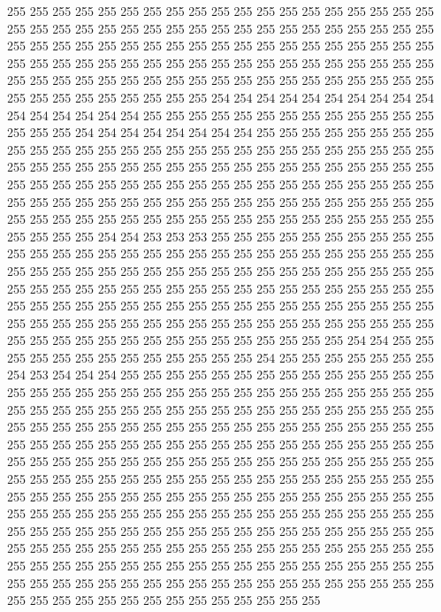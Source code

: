 255 255 255 255 255 255 255 255 255 255 255 255 255 255 255 255 255 255 255 255
255 255 255 255 255 255 255 255 255 255 255 255 255 255 255 255 255 255 255 255
255 255 255 255 255 255 255 255 255 255 255 255 255 255 255 255 255 255 255 255
255 255 255 255 255 255 255 255 255 255 255 255 255 255 255 255 255 255 255 255
255 255 255 255 255 255 255 255 255 255 255 255 255 255 255 255 255 255 255 255
255 255 255 255 254 254 254 254 254 254 254 254 254 254 254 254 254 254 254 254
255 255 255 255 255 255 255 255 255 255 255 255 255 255 255 255 254 254 254 254
254 254 254 254 255 255 255 255 255 255 255 255 255 255 255 255 255 255 255 255
255 255 255 255 255 255 255 255 255 255 255 255 255 255 255 255 255 255 255 255
255 255 255 255 255 255 255 255 255 255 255 255 255 255 255 255 255 255 255 255
255 255 255 255 255 255 255 255 255 255 255 255 255 255 255 255 255 255 255 255
255 255 255 255 255 255 255 255 255 255 255 255 255 255 255 255 255 255 255 255
255 255 255 255 255 255 255 255 255 255 255 254 254 253 253 253 255 255 255 255
255 255 255 255 255 255 255 255 255 255 255 255 255 255 255 255 255 255 255 255
255 255 255 255 255 255 255 255 255 255 255 255 255 255 255 255 255 255 255 255
255 255 255 255 255 255 255 255 255 255 255 255 255 255 255 255 255 255 255 255
255 255 255 255 255 255 255 255 255 255 255 255 255 255 255 255 255 255 255 255
255 255 255 255 255 255 255 255 255 255 255 255 255 255 255 255 255 255 255 255
255 255 255 255 255 255 255 255 255 255 255 255 255 255 255 255 254 254 255 255
255 255 255 255 255 255 255 255 255 255 255 254 255 255 255 255 255 255 255 254
253 254 254 254 255 255 255 255 255 255 255 255 255 255 255 255 255 255 255 255
255 255 255 255 255 255 255 255 255 255 255 255 255 255 255 255 255 255 255 255
255 255 255 255 255 255 255 255 255 255 255 255 255 255 255 255 255 255 255 255
255 255 255 255 255 255 255 255 255 255 255 255 255 255 255 255 255 255 255 255
255 255 255 255 255 255 255 255 255 255 255 255 255 255 255 255 255 255 255 255
255 255 255 255 255 255 255 255 255 255 255 255 255 255 255 255 255 255 255 255
255 255 255 255 255 255 255 255 255 255 255 255 255 255 255 255 255 255 255 255
255 255 255 255 255 255 255 255 255 255 255 255 255 255 255 255 255 255 255 255
255 255 255 255 255 255 255 255 255 255 255 255 255 255 255 255 255 255 255 255
255 255 255 255 255 255 255 255 255 255 255 255 255 255 255 255 255 255 255 255
255 255 255 255 255 255 255 255 255 255 255 255 255 255 255 255 255 255 255 255
255 255 255 255 255 255 255 255 255 255 255 255 255 255 255 255 255 255 255 255
255 255 255 255 255 255 255 255 255 255 255 255 255 255 255 255 255 255 255 255
